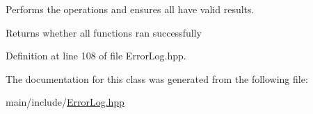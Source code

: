 Performs the operations and ensures all have valid results.

\begin{DoxyReturn}{Returns}
whether all functions ran successfully 
\end{DoxyReturn}


Definition at line 108 of file Error\+Log.\+hpp.


\begin{DoxyCode}{0}

\end{DoxyCode}


The documentation for this class was generated from the following file\+:\begin{DoxyCompactItemize}
\item 
main/include/\mbox{\hyperlink{ErrorLog_8hpp}{Error\+Log.\+hpp}}\end{DoxyCompactItemize}
